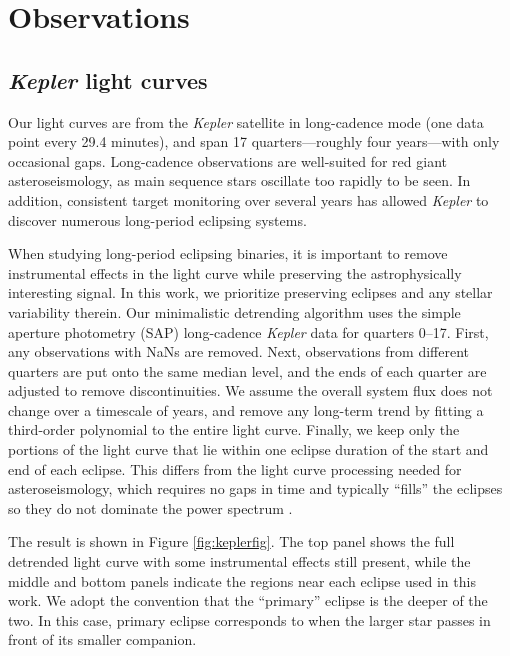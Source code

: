 \section{Observations}\label{data}

\subsection{\emph{Kepler} light curves}\label{kepler}
Our light curves are from the \emph{Kepler} satellite in long-cadence mode (one data point every 29.4 minutes), and span 17 quarters---roughly four years---with only occasional gaps. Long-cadence observations are well-suited for red giant asteroseismology, as main sequence stars oscillate too rapidly to be seen. In addition, consistent target monitoring over several years has allowed \emph{Kepler} to discover numerous long-period eclipsing systems.

When studying long-period eclipsing binaries, it is important to remove instrumental effects in the light curve while preserving the astrophysically interesting signal. In this work, we prioritize preserving eclipses and any stellar variability therein. Our minimalistic detrending algorithm uses the simple aperture photometry (SAP) long-cadence \emph{Kepler} data for quarters 0--17. First, any observations with NaNs are removed. Next, observations from different quarters are put onto the same median level, and the ends of each quarter are adjusted to remove discontinuities. We assume the overall system flux does not change over a timescale of years, and remove any long-term trend by fitting a third-order polynomial to the entire light curve. Finally, we keep only the portions of the light curve that lie within one eclipse duration of the start and end of each eclipse. This differs from the light curve processing needed for asteroseismology, which requires no gaps in time and typically ``fills'' the eclipses so they do not dominate the power spectrum \citep{gau14}.

The result is shown in Figure \ref{fig:keplerfig}. The top panel shows the full detrended light curve with some instrumental effects still present, while the middle and bottom panels indicate the regions near each eclipse used in this work. We adopt the convention that the ``primary'' eclipse is the deeper of the two. In this case, primary eclipse corresponds to when the larger star passes in front of its smaller companion.
